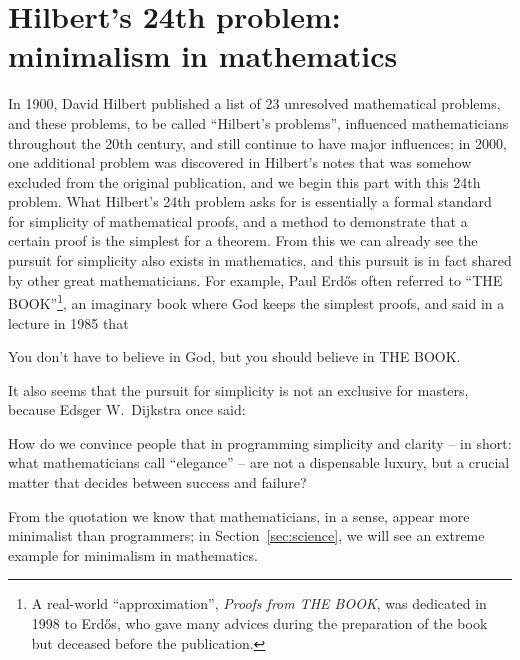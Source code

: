 \newpart
\section{Hilbert's 24th problem: minimalism in mathematics}\label{sec:hilbert}

In 1900, David Hilbert published a list of 23 unresolved mathematical
problems, and these problems, to be called ``Hilbert's problems'', influenced
mathematicians throughout the 20th century, and still continue to have major
influences; in 2000, one additional problem was discovered in Hilbert's notes
that was somehow excluded from the original publication, and we begin this part
with this 24th problem.  What Hilbert's 24th problem
asks for is essentially a formal standard for simplicity of mathematical proofs,
and a method to demonstrate that a certain proof is the simplest for a theorem.
From this we can already see the pursuit for simplicity also exists in
mathematics, and this pursuit is in fact shared by other great mathematicians.
For example, Paul Erdős often referred to ``THE BOOK''\footnote{A real-world
``approximation'', \emph{Proofs from THE BOOK}, was
dedicated in 1998 to Erdős, who gave many advices during the preparation
of the book but deceased before the publication.}, an imaginary book where
God keeps the simplest proofs, and said in a lecture in 1985 that
\begin{quoting}
	You don't have to believe in God, but you should believe in THE BOOK.
\end{quoting}
It also seems that the pursuit for simplicity is not an exclusive for masters,
because Edsger W.\ Dijkstra once said:
\begin{quoting}
	How do we convince people that in programming simplicity and clarity --
	in short: what mathematicians call ``elegance'' -- are not a dispensable
	luxury, but a crucial matter that decides between success and failure?
\end{quoting}
From the quotation we know that mathematicians, in a sense, appear more
minimalist than programmers; in Section~\ref{sec:science}, we will
see an extreme example for minimalism in mathematics.

